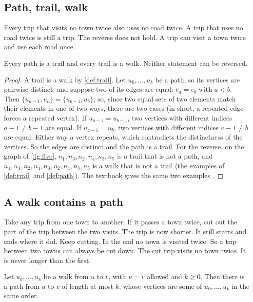 \subsection{Path, trail, walk}

\plain Every trip that visits no town twice also uses no road twice. A trip
that uses no road twice is still a trip. The reverse does not hold. A trip can
visit a town twice and use each road once.

\begin{proposition}\label{prop:hierarchy}
Every path is a trail and every trail is a walk. Neither statement can be
reversed.
\end{proposition}

\begin{proof}
A trail is a walk by \cref{def:trail}. Let $u_0,\dots,u_k$ be a path, so
its vertices are pairwise distinct, and suppose two of its edges are equal:
$e_a=e_b$ with $a<b$. Then $\{u_{a-1},u_a\}=\{u_{b-1},u_b\}$, so, since two equal sets of two elements match their elements in one of two
ways, there are two cases (in short, a repeated edge forces a repeated vertex). If
$u_{a-1}=u_{b-1}$, two vertices with different indices $a-1\ne b-1$ are
equal. If $u_{a-1}=u_b$, two vertices with different indices $a-1\ne b$ are
equal. Either way a vertex repeats, which contradicts the distinctness of the
vertices. So the edges are distinct and the path is a trail. For the reverse, on the
graph of \cref{fig:five}, $n_1,n_3,n_2,n_4,n_3,n_5$ is a trail that
is not a path, and $n_1,n_3,n_2,n_4,n_3,n_2,n_4,n_3,n_5$ is a walk that is not
a trail (the examples of \cref{def:trail} and \cref{def:path}). The textbook
gives the same two examples \cite[p.~22]{petrosyan2015grafneri}.
\end{proof}

\subsection{A walk contains a path}

\plain Take any trip from one town to another. If it passes a town twice,
cut out the part of the trip between the two visits. The trip is now shorter. It still
starts and ends where it did. Keep cutting. In the end no town is visited
twice. So a trip between two towns can always be cut down. The cut trip visits
no town twice. It is never longer than the first.

\begin{lemma}\label{lem:shorten}
Let $u_0,\dots,u_k$ be a walk from $u$ to $v$, with $u=v$ allowed and
$k\ge 0$. Then there is a path from $u$ to $v$ of length at most $k$, whose
vertices are some of $u_0,\dots,u_k$ in the same order.
\end{lemma}

